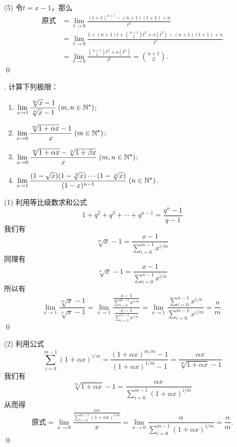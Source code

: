 (5) \solve 令$t = x-1$，那么
\begin{align}
    \text{原式} &= \lim_{t \to 0} \frac{(t+1)^{n+1}-(n+1)(t+1)+n}{t^2} \\
    &= \lim_{t \to 0} \frac{1 + (n+1)t + \binom{n+1}{2}t^2 + o(t^2) - (n+1)(t+1)+n}{t^2} \\
    &= \lim_{t \to 0} \frac{\binom{n+1}{2}t^2+o(t^2)}{t^2} = \binom{n+1}{2}.
\end{align}
\qed\bigskip

. 计算下列极限：
\begin{enumerate}
    \item $\displaystyle\lim_{x \to 1}\displaystyle\frac{\sqrt[m]{x}-1}{\sqrt[n]{x}-1} \; (m,n \in \mathbb{N}^\star)$;
    \item $\displaystyle\lim_{x \to 0}\displaystyle\frac{\sqrt[m]{1+\alpha x}-1}{x} \; (m \in \mathbb{N}^\star)$; 
    \item $\displaystyle\lim_{x \to 0}\displaystyle\frac{\sqrt[m]{1+\alpha x}-\sqrt[n]{1+\beta x}}{x} \; (m,n \in \mathbb{N}^\star)$;
    \item $\displaystyle\lim_{x \to 1}\displaystyle\frac{(1-\sqrt{x})(1-\sqrt[3]{x})\cdots(1-\sqrt[n]{x})}{(1-x)^{n-1}} \; (n \in \mathbb{N}^\star)$.
\end{enumerate}
\bigskip

(1) \solve 利用等比级数求和公式
\begin{equation}
    1+q^2+q^3+\cdots+q^{n-1}=\frac{q^n-1}{q-1}
\end{equation}
我们有
\begin{equation}
    \sqrt[m]{x}-1=\frac{x-1}{\displaystyle\sum_{i=0}^{m-1}x^{i/m}}
\end{equation}
同理有
\begin{equation}
    \sqrt[n]{x}-1=\frac{x-1}{\displaystyle\sum_{i=0}^{n-1}x^{i/n}}
\end{equation}
所以有
\begin{equation}
    \lim_{x \to 1}\frac{\sqrt[m]{x}-1}{\sqrt[n]{x}-1}=\lim_{x\to 1}\frac{\displaystyle\frac{x-1}{\displaystyle\sum_{i=0}^{m-1}x^{i/m}}}{\displaystyle\frac{x-1}{\displaystyle\sum_{i=0}^{n-1}x^{i/n}}} = \lim_{x \to 1}\frac{\displaystyle\sum_{i=0}^{n-1}x^{i/n}}{\displaystyle\sum_{i=0}^{m-1}x^{i/m}} = \frac{n}{m}.
\end{equation}
\qed\bigskip

(2) \solve 利用公式
\begin{equation}
    \sum_{i=0}^{m-1}(1+\alpha x)^{i/m} = \frac{(1+\alpha x)^{m/m}-1}{(1+\alpha x)^{1/m}-1}=\frac{\alpha x}{\sqrt[m]{1+\alpha x}-1}
\end{equation}
我们有
\begin{equation}
    \sqrt[m]{1+\alpha x} - 1 = \frac{\alpha x}{\displaystyle\sum_{i=0}^{m-1}(1+\alpha x)^{i/m}}
\end{equation}
从而得
\begin{equation}
    \text{原式} = \lim_{x \to 0} \frac{\displaystyle\frac{\alpha x}{\displaystyle\sum_{i=0}^{m-1}(1+\alpha x)^{i/m}}}{x} = \lim_{x \to 0} \frac{\alpha}{\displaystyle\sum_{i=0}^{m-1}(1+\alpha x)^{i/m}} = \frac{\alpha}{m} .
\end{equation}
\qed\bigskip

